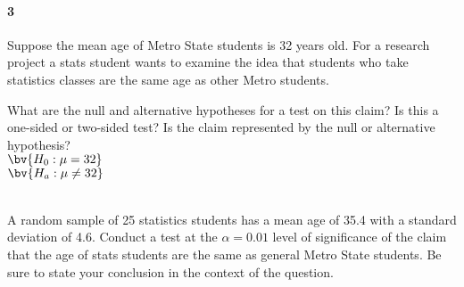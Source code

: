 \documentclass{article}
\begin{document}
\begin{flushleft}
\paragraph{3} Suppose the mean age of Metro State students is 32 years old. For a research project a stats student wants to examine the idea that students who take statistics classes are the same age as other Metro students. 
\begin{enumalpha}
\item What are the null and alternative hypotheses for a test on this claim? Is this a one-sided or two-sided test? Is the claim represented by the null or alternative hypothesis?\\
\medskip
$\bv{H_0: \mu = 32}$\\
$\bv{H_a: \mu \ne 32}$\\
\\
\vspace{.5in}
\item A random sample of 25 statistics students has a mean age of 35.4 with a standard deviation of 4.6. Conduct a test at the $\alpha = 0.01$ level of significance of the claim that the age of stats students are the same as general Metro State students. Be sure to state your conclusion in the context of the question.\\
\medskip
{}

\end{enumalpha}

\newpage

\end{flushleft}
\end{document}
